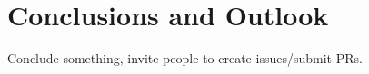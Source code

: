 \documentclass[preprint,times,tighten]{aastex63}
\begin{document}
\section{Conclusions and Outlook}\label{Sec:Conclusions}

Conclude something, invite people to create issues/submit PRs.




\end{document}
